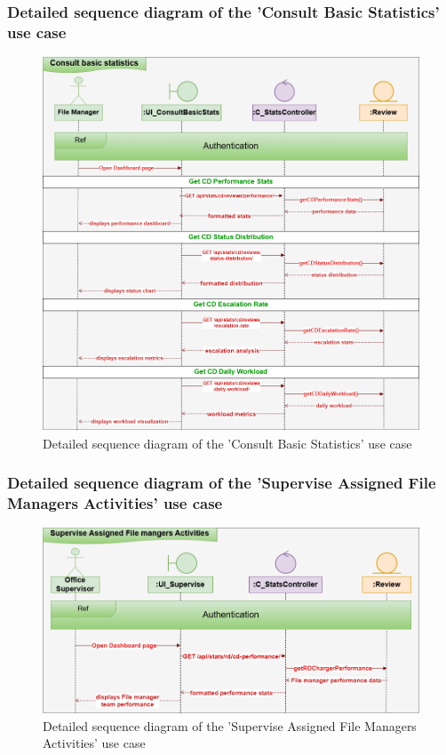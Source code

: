 \subsubsection{Detailed sequence diagram of the 'Consult Basic Statistics' use case}
\begin{figure}[h!]
    \centering
    \includegraphics[width=1\textwidth]{figures/det consult basic stat.png}
    \caption{Detailed sequence diagram of the 'Consult Basic Statistics' use case}
\end{figure}
\clearpage
\subsubsection{Detailed sequence diagram of the 'Supervise Assigned File Managers Activities' use case}
\begin{figure}[h!]
    \centering
    \includegraphics[width=1\textwidth]{figures/det supervise assigned file managers activities.png}
    \caption{Detailed sequence diagram of the 'Supervise Assigned File Managers Activities' use case}
\end{figure}
